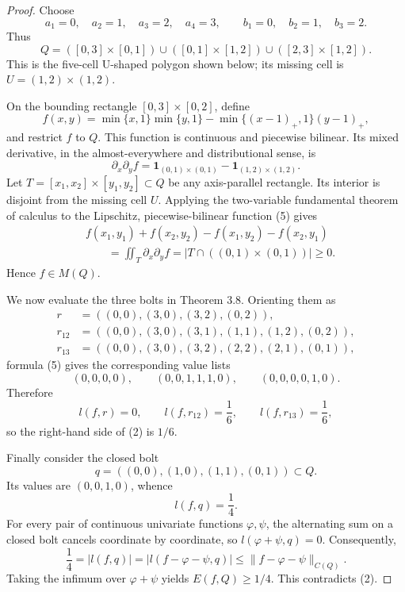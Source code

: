 \documentclass[11pt]{article}
\newcommand{\pos}[1]{(#1)_{+}}
\begin{document}
\begin{proof}
Choose
\[
 a_1=0,\quad a_2=1,\quad a_3=2,\quad a_4=3,
 \qquad b_1=0,\quad b_2=1,\quad b_3=2.
\]
Thus
\[
 Q=([0,3]\times[0,1])
 \cup([0,1]\times[1,2])
 \cup([2,3]\times[1,2]).
\tag{4}
\]
This is the five-cell U-shaped polygon shown below; its missing cell is
$U=(1,2)\times(1,2)$.

\begin{center}
\end{center}

On the bounding rectangle $[0,3]\times[0,2]$, define
\[
 f(x,y)=\min\{x,1\}\min\{y,1\}
       -\min\{\pos{x-1},1\}\pos{y-1},
\tag{5}
\]
and restrict $f$ to $Q$. This function is continuous and piecewise
bilinear. Its mixed derivative, in the almost-everywhere and distributional
sense, is
\[
 \partial_x\partial_y f
 =\mathbf 1_{(0,1)\times(0,1)}
  -\mathbf 1_{(1,2)\times(1,2)}.
\tag{6}
\]
Let $T=[x_1,x_2]\times[y_1,y_2]\subset Q$ be any axis-parallel
rectangle. Its interior is disjoint from the missing cell $U$. Applying
the two-variable fundamental theorem of calculus to the Lipschitz,
piecewise-bilinear function (5) gives
\[
\begin{split}
 &f(x_1,y_1)+f(x_2,y_2)-f(x_1,y_2)-f(x_2,y_1)\\
 &\qquad=\iint_T\partial_x\partial_y f
 =\bigl|T\cap((0,1)\times(0,1))\bigr|\geq0.
\end{split}
\tag{7}
\]
Hence $f\in M(Q)$.

We now evaluate the three bolts in Theorem 3.8. Orienting them as
\[
\begin{split}
 r&=((0,0),(3,0),(3,2),(0,2)),\\
 r_{12}&=((0,0),(3,0),(3,1),(1,1),(1,2),(0,2)),\\
 r_{13}&=((0,0),(3,0),(3,2),(2,2),(2,1),(0,1)),
\end{split}
\]
formula (5) gives the corresponding value lists
\[
 (0,0,0,0),\qquad
 (0,0,1,1,1,0),\qquad
 (0,0,0,0,1,0).
\]
Therefore
\[
 l(f,r)=0,\qquad
 l(f,r_{12})=\frac16,\qquad
 l(f,r_{13})=\frac16,
\tag{8}
\]
so the right-hand side of (2) is $1/6$.

Finally consider the closed bolt
\[
 q=((0,0),(1,0),(1,1),(0,1))\subset Q.
\]
Its values are $(0,0,1,0)$, whence
\[
 l(f,q)=\frac14.
\tag{9}
\]
For every pair of continuous univariate functions $\varphi,\psi$, the
alternating sum on a closed bolt cancels coordinate by coordinate, so
$l(\varphi+\psi,q)=0$. Consequently,
\[
\frac14
=|l(f,q)|
=|l(f-\varphi-\psi,q)|
\leq\|f-\varphi-\psi\|_{C(Q)}.
\]
Taking the infimum over $\varphi+\psi$ yields
$E(f,Q)\geq1/4$. This contradicts (2).
\end{proof}
\end{document}
